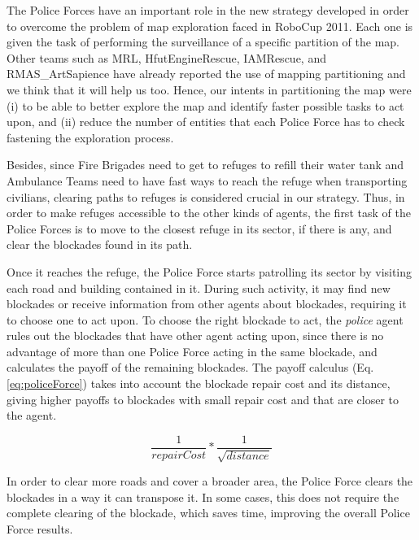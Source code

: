 The Police Forces have an important role in the new strategy developed in order to overcome the problem of map exploration faced in RoboCup 2011. Each one is given the task of performing the surveillance of a specific partition of the map. Other teams such as MRL, HfutEngineRescue, IAMRescue, and RMAS\_ArtSapience have already reported the use of mapping partitioning and we think that it will help us too. Hence, our intents in partitioning the map were (i) to be able to better explore the map and identify faster possible tasks to act upon, and (ii) reduce the number of entities that each Police Force has to check fastening the exploration process.

Besides, since Fire Brigades need to get to refuges to refill their water tank and Ambulance Teams need to have fast ways to reach the refuge when transporting civilians, clearing paths to refuges is considered crucial in our strategy. Thus, in order to make refuges accessible to the other kinds of agents, the first task of the Police Forces is to move to the closest refuge in its sector, if there is any, and clear the blockades found in its path.

Once it reaches the refuge, the Police Force starts patrolling its sector by visiting each road and building contained in it. During such activity, it may find new blockades or receive information from other agents about blockades, requiring it to choose one to act upon. To choose the right blockade to act, the {\it police} agent rules out the blockades that have other agent acting upon, since there is no advantage of more than one Police Force acting in the same blockade, and calculates the payoff of the remaining blockades. The payoff calculus (Eq. \ref{eq:policeForce}) takes into account the blockade repair cost and its distance, giving higher payoffs to blockades with small repair cost and that are closer to the agent.

\begin{equation}
\label{eq:policeForce}
\frac{1}{repairCost} * \frac{1}{\sqrt{distance}}
\end{equation}

In order to clear more roads and cover a broader area, the Police Force clears the blockades in a way it can transpose it. In some cases, this does not require the complete clearing of the blockade, which saves time, improving the overall Police Force results.
